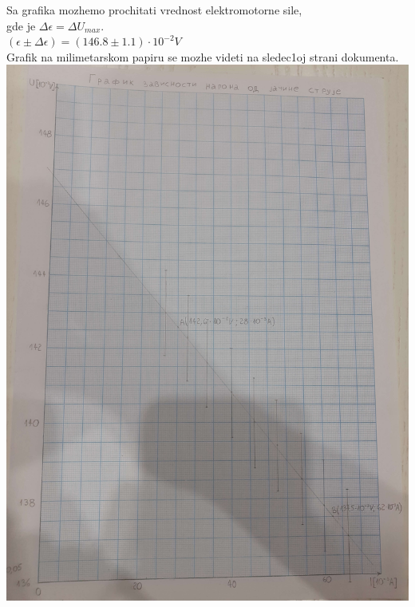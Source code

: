 \documentclass[11pt]{article}
\begin{document}
Sa grafika mozhemo prochitati vrednost elektromotorne sile,\\
gde je $\Delta\epsilon=\Delta U_{max}.$\\[5mm]
$(\epsilon\pm\Delta\epsilon)=(146.8\pm 1.1)\cdot10^{-2}V$\\

Grafik na milimetarskom papiru se mozhe videti na sledec1oj strani dokumenta.
\includegraphics[scale=0.16]{slika.jpg}
\end{document}
